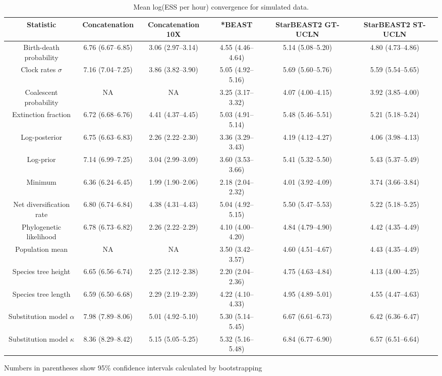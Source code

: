 \documentclass[12pt]{article}
\begin{document}
\begin{landscape}

\begin{table}[htb!]
\centering
\caption{Mean log(ESS per hour) convergence for simulated data.}
\label{tab:simulatedPerHour}
\begin{threeparttable}
\begin{adjustbox}{center}
\renewcommand{\arraystretch}{1.2}
\footnotesize
\begin{tabular}{|c|c|c|c|c|c|}
\multicolumn{1}{c}{Statistic} & \multicolumn{1}{c}{Concatenation} & \multicolumn{1}{c}{Concatenation 10X} & \multicolumn{1}{c}{*BEAST} & \multicolumn{1}{c}{StarBEAST2 GT-UCLN} & \multicolumn{1}{c}{StarBEAST2 ST-UCLN}\tabularnewline
\hline
Birth-death probability & 6.76 (6.67--6.85) & 3.06 (2.97--3.14) & 4.55 (4.46--4.64) & 5.14 (5.08--5.20) & 4.80 (4.73--4.86)\tabularnewline
\hline
Clock rates $\sigma$ & 7.16 (7.04--7.25) & 3.86 (3.82--3.90) & 5.05 (4.92--5.16) & 5.69 (5.60--5.76) & 5.59 (5.54--5.65)\tabularnewline
\hline
Coalescent probability & NA & NA & 3.25 (3.17--3.32) & 4.07 (4.00--4.15) & 3.92 (3.85--4.00)\tabularnewline
\hline
Extinction fraction & 6.72 (6.68--6.76) & 4.41 (4.37--4.45) & 5.03 (4.91--5.14) & 5.48 (5.46--5.51) & 5.21 (5.18--5.24)\tabularnewline
\hline
Log-posterior & 6.75 (6.63--6.83) & 2.26 (2.22--2.30) & 3.36 (3.29--3.43) & 4.19 (4.12--4.27) & 4.06 (3.98--4.13)\tabularnewline
\hline
Log-prior & 7.14 (6.99--7.25) & 3.04 (2.99--3.09) & 3.60 (3.53--3.66) & 5.41 (5.32--5.50) & 5.43 (5.37--5.49)\tabularnewline
\hline
Minimum & 6.36 (6.24--6.45) & 1.99 (1.90--2.06) & 2.18 (2.04--2.32) & 4.01 (3.92--4.09) & 3.74 (3.66--3.84)\tabularnewline
\hline
Net diversification rate & 6.80 (6.74--6.84) & 4.38 (4.31--4.43) & 5.04 (4.92--5.15) & 5.50 (5.47--5.53) & 5.22 (5.18--5.25)\tabularnewline
\hline
Phylogenetic likelihood & 6.78 (6.73--6.82) & 2.26 (2.22--2.29) & 4.10 (4.00--4.20) & 4.84 (4.79--4.90) & 4.42 (4.35--4.49)\tabularnewline
\hline
Population mean & NA & NA & 3.50 (3.42--3.57) & 4.60 (4.51--4.67) & 4.43 (4.35--4.49)\tabularnewline
\hline
Species tree height & 6.65 (6.56--6.74) & 2.25 (2.12--2.38) & 2.20 (2.04--2.36) & 4.75 (4.63--4.84) & 4.13 (4.00--4.25)\tabularnewline
\hline
Species tree length & 6.59 (6.50--6.68) & 2.29 (2.19--2.39) & 4.22 (4.10--4.33) & 4.95 (4.89--5.01) & 4.55 (4.47--4.63)\tabularnewline
\hline
Substitution model $\alpha$ & 7.98 (7.89--8.06) & 5.01 (4.92--5.10) & 5.30 (5.14--5.45) & 6.67 (6.61--6.73) & 6.42 (6.36--6.47)\tabularnewline
\hline
Substitution model $\kappa$ & 8.36 (8.29--8.42) & 5.15 (5.05--5.25) & 5.32 (5.16--5.48) & 6.84 (6.77--6.90) & 6.57 (6.51--6.64)\tabularnewline
\hline
\end{tabular}
\end{adjustbox}
\begin{tablenotes}
\footnotesize
\item Numbers in parentheses show 95\% confidence intervals calculated by bootstrapping
\end{tablenotes}
\end{threeparttable}
\end{table}


\end{landscape}
\end{document}
